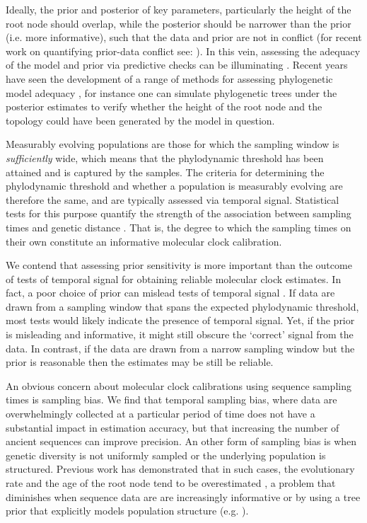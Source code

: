 \documentclass[11pt]{article}
\begin{document}
Ideally, the prior and posterior of key parameters, particularly the height of the root node should overlap, while the posterior should be narrower than the prior (i.e. more informative), such that the data and prior are not in conflict (for recent work on quantifying prior-data conflict see: \citealt{nott2020checking}). In this vein, assessing the adequacy of the model and prior via predictive checks can be illuminating \citep{mcelreath2018statistical}. Recent years have seen the development of a range of methods for assessing phylogenetic model adequacy \citep{duchene2019phylodynamic, mcelreath2018statistical, brown2018evaluating, duchene2018phylomad}, for instance one can simulate phylogenetic trees under the posterior estimates to verify whether the height of the root node and the topology could have been generated by the model in question. 

Measurably evolving populations are those for which the sampling window is \textit{sufficiently} wide, which means that the phylodynamic threshold has been attained and is captured by the samples. The criteria for determining the phylodynamic threshold and whether a population is measurably evolving are therefore the same, and are typically assessed via temporal signal. Statistical tests for this purpose quantify the strength of the association between sampling times and genetic distance \citep{rieux2016inferences, duchene2015performance, murray2016effect, featherstone2024clockor2, rambaut2016exploring}. That is, the degree to which the sampling times on their own constitute an informative molecular clock calibration. 

We contend that assessing prior sensitivity is more important than the outcome of tests of temporal signal for obtaining reliable molecular clock estimates. In fact, a poor choice of prior can mislead tests of temporal signal \citep{tay2024assessing}. If data are drawn from a sampling window that spans the expected phylodynamic threshold, most tests would likely indicate the presence of temporal signal. Yet, if the prior is misleading and informative, it might still obscure the `correct' signal from the data. In contrast, if the data are drawn from a narrow sampling window but the prior is reasonable then the estimates may be still be reliable. 

An obvious concern about molecular clock calibrations using sequence sampling times is sampling bias. We find that temporal sampling bias, where data are overwhelmingly collected at a particular period of time does not have a substantial impact in estimation accuracy, but that increasing the number of ancient sequences can improve precision. An other form of sampling bias is when genetic diversity is not uniformly sampled or the underlying population is structured. Previous work has demonstrated that in such cases, the evolutionary rate and the age of the root node tend to be overestimated \citep{moller2018impact}, a problem that diminishes when sequence data are are increasingly informative or by using  a tree prior that explicitly models population structure (e.g. \citealt{kuhnert2016phylodynamics, muller2017structured}). 
\end{document}
